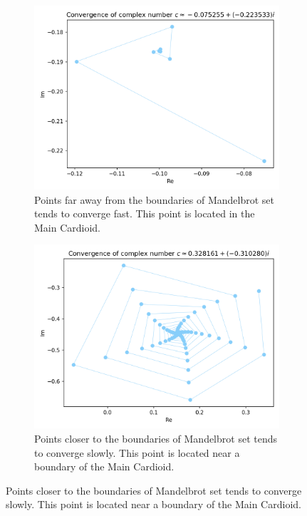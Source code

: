 \documentclass{article}
\begin{document}
    \begin{figure}[h]
        \centering
        \begin{subfigure}[t]{.47\linewidth}
            \includegraphics[width=\textwidth]{pictures/appendix/fast_convergence_2_c.png}
            \caption{Points far away from the boundaries of Mandelbrot set tends to converge fast. This point is located in the Main Cardioid.}
            \label{fig:complex_points_convergence_fast}
        \end{subfigure}
        \begin{subfigure}[t]{.47\linewidth}
            \includegraphics[width=\textwidth]{pictures/appendix/slow_convergence_c.png}
            \caption{Points closer to the boundaries of Mandelbrot set tends to converge slowly. This point is located near a boundary of the Main Cardioid.}
            \label{fig:complex_points_convergence_slow}
        \end{subfigure}


\end{figure}
\end{document}
